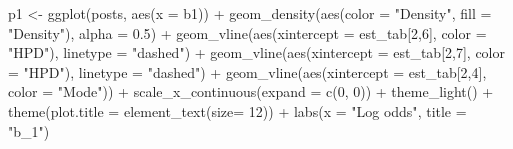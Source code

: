 \documentclass[12pt]{article}
\newenvironment{Shaded}{\begin{snugshade}}{\end{snugshade}}
\newcommand{\AttributeTok}[1]{\textcolor[rgb]{0.77,0.63,0.00}{#1}}
\newcommand{\DecValTok}[1]{\textcolor[rgb]{0.00,0.00,0.81}{#1}}
\newcommand{\FloatTok}[1]{\textcolor[rgb]{0.00,0.00,0.81}{#1}}
\newcommand{\FunctionTok}[1]{\textcolor[rgb]{0.00,0.00,0.00}{#1}}
\newcommand{\NormalTok}[1]{#1}
\newcommand{\OtherTok}[1]{\textcolor[rgb]{0.56,0.35,0.01}{#1}}
\newcommand{\SpecialCharTok}[1]{\textcolor[rgb]{0.00,0.00,0.00}{#1}}
\newcommand{\StringTok}[1]{\textcolor[rgb]{0.31,0.60,0.02}{#1}}
\begin{document}
\begin{Shaded}
\begin{Highlighting}[]
\NormalTok{p1 }\OtherTok{\textless{}{-}} \FunctionTok{ggplot}\NormalTok{(posts, }\FunctionTok{aes}\NormalTok{(}\AttributeTok{x =}\NormalTok{ b1)) }\SpecialCharTok{+}
  \FunctionTok{geom\_density}\NormalTok{(}\FunctionTok{aes}\NormalTok{(}\AttributeTok{color =} \StringTok{"Density"}\NormalTok{, }\AttributeTok{fill =} \StringTok{"Density"}\NormalTok{), }\AttributeTok{alpha =} \FloatTok{0.5}\NormalTok{) }\SpecialCharTok{+}
  \FunctionTok{geom\_vline}\NormalTok{(}\FunctionTok{aes}\NormalTok{(}\AttributeTok{xintercept =}\NormalTok{ est\_tab[}\DecValTok{2}\NormalTok{,}\DecValTok{6}\NormalTok{], }\AttributeTok{color =} \StringTok{"HPD"}\NormalTok{), }\AttributeTok{linetype =} \StringTok{"dashed"}\NormalTok{) }\SpecialCharTok{+}
  \FunctionTok{geom\_vline}\NormalTok{(}\FunctionTok{aes}\NormalTok{(}\AttributeTok{xintercept =}\NormalTok{ est\_tab[}\DecValTok{2}\NormalTok{,}\DecValTok{7}\NormalTok{], }\AttributeTok{color =} \StringTok{"HPD"}\NormalTok{), }\AttributeTok{linetype =} \StringTok{"dashed"}\NormalTok{) }\SpecialCharTok{+}
  \FunctionTok{geom\_vline}\NormalTok{(}\FunctionTok{aes}\NormalTok{(}\AttributeTok{xintercept =}\NormalTok{ est\_tab[}\DecValTok{2}\NormalTok{,}\DecValTok{4}\NormalTok{], }\AttributeTok{color =} \StringTok{"Mode"}\NormalTok{)) }\SpecialCharTok{+}
  \FunctionTok{scale\_x\_continuous}\NormalTok{(}\AttributeTok{expand =} \FunctionTok{c}\NormalTok{(}\DecValTok{0}\NormalTok{, }\DecValTok{0}\NormalTok{)) }\SpecialCharTok{+}
  \FunctionTok{theme\_light}\NormalTok{() }\SpecialCharTok{+}
  \FunctionTok{theme}\NormalTok{(}\AttributeTok{plot.title =} \FunctionTok{element\_text}\NormalTok{(}\AttributeTok{size=} \DecValTok{12}\NormalTok{)) }\SpecialCharTok{+} 
  \FunctionTok{labs}\NormalTok{(}\AttributeTok{x =} \StringTok{"Log odds"}\NormalTok{,}
       \AttributeTok{title =} \StringTok{"b\_1"}\NormalTok{)}


\end{Highlighting}
\end{Shaded}
\end{document}
